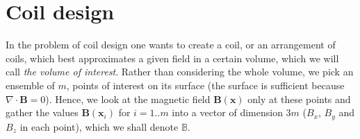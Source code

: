 

%


\section{Coil design}
\label{sec:coil_design}
In the problem of coil design one wants to create a coil, or an arrangement of coils, which best approximates a given field in a certain volume, which we will call \emph{the volume of interest}. Rather than considering the whole volume, we pick an ensemble of $m$, points of interest on its surface (the surface is sufficient because $\nabla \cdot \mathbf{B} = 0$). Hence, we look at the magnetic field $\mathbf{B}(\mathbf{x})$ only at these points and gather the values $\mathbf{B}(\mathbf{x}_i)$ for $i = 1 .. m$ into a vector of dimension $3m$ ($B_x$, $B_y$ and $B_z$ in each point), which we shall denote $\mathbb{B}$.

